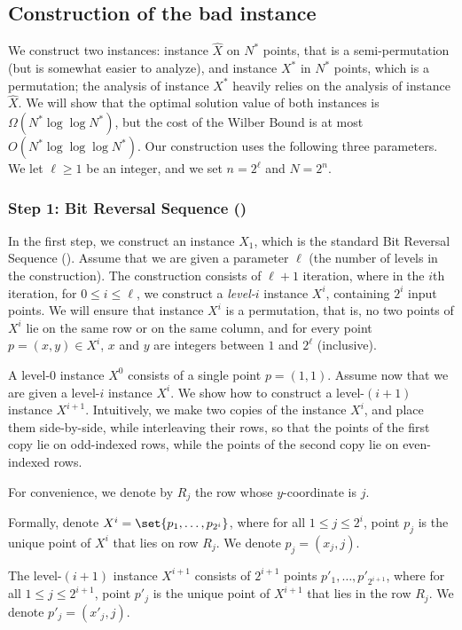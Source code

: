 \subsection{Construction of the bad instance} 

\label{sec:construction}
We construct two instances: instance $\hat X$ on $N^*$ points, that is a semi-permutation (but is somewhat easier to analyze), and instance $X^*$ in $N^*$ points, which is a permutation; the analysis of instance $X^*$ heavily relies on the analysis of instance $\hat X$. 
We will show that the optimal solution value of both instances is $\Omega(N^*\log\log N^*)$, but the cost of the Wilber Bound is at most $O(N^*\log\log\log N^*)$.
Our construction uses the following three parameters. We let $\ell\geq 1$ be an integer, and we set $n=2^{\ell}$ and $N = 2^n$. 


\iffalse 


\subsubsection{Step 1: Bit Reversal Sequence (\BRS)}
In the first step, we construct an instance $X_1$, which is the standard Bit Reversal Sequence (\BRS). Assume that we are given a parameter $\ell$ (the number of levels in the construction). The construction consists of $\ell+1$ iteration, where in the $i$th iteration, for $0 \leq i\leq \ell$, we construct a \emph{level-$i$} instance $X^i$, containing $2^i$ input points. We will ensure that instance $X^i$ is a permutation, that is, no two points of $X^i$ lie on the same row or on the same column, and for every point $p=(x,y)\in X^i$, $x$ and $y$ are integers between $1$ and $2^{\ell}$ (inclusive).%

A level-$0$ instance $X^0$ consists of a single point $p=(1,1)$.
Assume now that we are given a level-$i$ instance $X^i$. We show how to construct a level-$(i+1)$ instance $X^{i+1}$.
Intuitively, we make two copies of the instance $X^i$, and place them side-by-side, while interleaving their rows, so that the points of the first copy lie on odd-indexed rows, while the points of the second copy lie on even-indexed rows.

For convenience, we denote by $R_j$ the row whose $y$-coordinate is $j$.

Formally, denote $X^i=\set{p_1,\ldots,p_{2^i}}$, where for all $1\leq j\leq 2^i$, point $p_j$ is the unique point of $X^i$ that lies on row $R_j$. We denote $p_j=(x_j,j)$.

The level-$(i+1)$ instance $X^{i+1}$ consists of $2^{i+1}$ points $p'_1,\ldots,p'_{2^{i+1}}$, where for all $1\leq j\leq 2^{i+1}$, point $p'_j$ is the unique point of $X^{i+1}$ that lies in the row $R_j$. We denote $p'_j=(x'_j,j)$.


